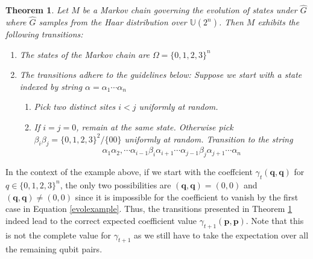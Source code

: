 \documentclass[12pt]{amsart}
\newtheorem{theorem}{Theorem}[section]
\theoremstyle{definition}
\theoremstyle{remark}
\numberwithin{equation}{section}
\theoremstyle{remark}
\begin{document}
\begin{theorem} \label{haarevol}
  Let $M$ be a Markov chain governing the evolution of states under $\widehat{G}$ where $\widehat{G}$ samples from the Haar distribution over $\mathbb{U}(2^n)$. Then $M$ exhibits the following transitions:
  \begin{enumerate}
    \item The states of the Markov chain are $\Omega = \{0,1,2,3\}^n$
    \item The transitions adhere to the guidelines below: Suppose we start with a state indexed by string $\alpha = \alpha_1\cdots\alpha_n$
      \begin{enumerate}
        \item Pick two distinct sites $i < j$ uniformly at random.
        \item If $i = j = 0$, remain at the same state. Otherwise pick $\beta_i\beta_j = \{0,1,2,3\}^2/\{00\}$ uniformly at random. Transition to the string
        $$\alpha_1\alpha_2,\cdots\alpha_{i-1}\beta_i\alpha_{i+1}\cdots \alpha_{j-1}\beta_{j}\alpha_{j+1}\cdots\alpha_n$$
      \end{enumerate}
  \end{enumerate}
\end{theorem}
In the context of the example above, if we start with the coeffcient $\gamma_t(\textbf{q},\textbf{q})$ for $q \in \{0,1,2,3\}^n$, the only two possibilities are $(\textbf{q},\textbf{q}) = (0,0)$ and $(\textbf{q},\textbf{q}) \neq (0,0)$ since it is impossible for the coefficient to vanish by the first case in Equation \ref{evolexample}. Thus, the transitions presented in Theorem \ref{haarevol} indeed lead to the correct expected coefficient value $\gamma_{t+1}(\textbf{p},\textbf{p})$. Note that this is not the complete value for $\gamma_{t+1}$ as we still have to take the expectation over all the remaining qubit pairs.
\end{document}
